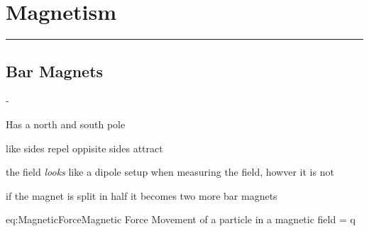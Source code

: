 \setcounter{section}{11}

\pagebreak
\section{Magnetism}
\hrule
\vspace{.5cm}
\subsection{Bar Magnets}
\begin{list}{-}{}
\item Has a north and south pole 
\item like sides repel oppisite sides attract 
\item the field \textit{looks} like a dipole setup when measuring the field, howver it is not
\item if the magnet is split in half it becomes two more bar magnets 
\end{list}

\begin{eqboxed}{eq:MagneticForce}{Magnetic Force}
{Movement of a particle in a magnetic field}
 = q \times {}
\end{eqboxed}